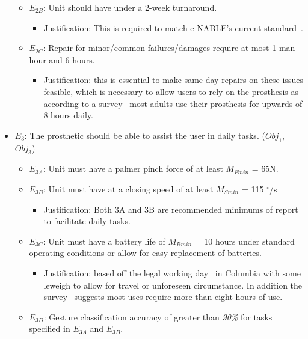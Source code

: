 \documentclass[12pt,3p]{elsarticle}
\begin{document}
\begin{itemize}
\begin{itemize}
	\item $E_{2B}$: Unit should have under a 2-week turnaround.
		\begin{itemize}
		\item Justification: This is required to match e-NABLE’s current standard~\cite{Armfield}.
		\end{itemize}
		
	\item $E_{2C}$: Repair for minor/common failures/damages require at most 1 man hour and 6 hours.
		\begin{itemize}
		\item Justification: this is essential to make same day repairs on these issues feasible, which is necessary to allow users to rely on the prosthesis as according to a survey~\cite{Pylatiuk} most adults use their prosthesis for upwards of 8 hours daily.
		\end{itemize}
		
	\end{itemize}
	
\item $E_3$: The prosthetic should be able to assist the user in daily tasks. ($Obj_1$, $Obj_3$)
	\begin{itemize}
	\item $E_{3A}$: Unit must have a palmer pinch force of at least $M_{Fmin}$ = 65N.
	\item $E_{3B}$: Unit must have at a closing speed of at least $M_{Smin}$ = 115 $^{\circ}$/s
		\begin{itemize}
		\item Justification: Both 3A and 3B are recommended minimums of report~\cite{Belter} to facilitate daily tasks.
		\end{itemize}
		
	\item $E_{3C}$: Unit must have a battery life of $M_{Bmin}$ = 10 hours under standard operating conditions or allow for easy replacement of batteries.
		\begin{itemize}
		\item Justification: based off the legal working day~\cite{LaE} in Columbia with some leweigh to allow for travel or unforeseen circumstance. In addition the survey~\cite{Pylatiuk} suggests most uses require more than eight hours of use.
		\end{itemize}
		
	\item $E_{3D}$: Gesture classification accuracy of greater than \textit{90\%} for tasks specified in \textit{$E_{3A}$} and \textit{$E_{3B}$}.
	

\end{itemize}
\end{itemize}
\end{document}

